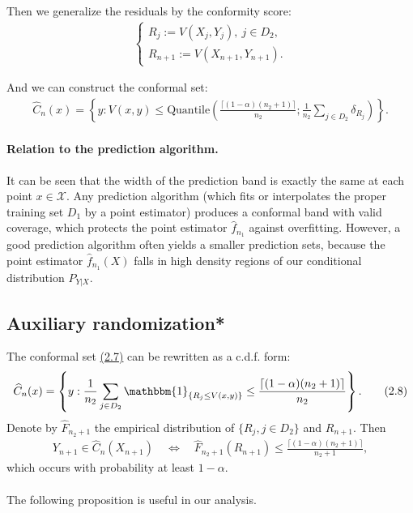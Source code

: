 \documentclass{article}
\numberwithin{equation}{section}
\begin{document}
Then we generalize the residuals by the conformity score:
\begin{align*}
	\begin{cases}
		R_j:=V(X_j,Y_j),\ j\in D_2,\\
		R_{n+1} := V(X_{n+1},Y_{n+1}).
	\end{cases}
	\tag{2.6}
\end{align*}

And we can construct the conformal set:
\begin{align*}
	\widehat{C}_n(x)=\left\{y:V(x,y)\leq\mathrm{Quantile}\left(\frac{\lceil(1-\alpha)(n_2+1)\rceil}{n_2};\frac{1}{n_2}\sum_{j\in D_2}\delta_{R_j}\right)\right\}.\tag{2.7}\label{2.7}
\end{align*}

\paragraph{Relation to the prediction algorithm.} It can be seen that the width of the prediction band is exactly the same at each point $x\in\mathcal{X}.$ Any prediction algorithm (which fits or interpolates the proper training set $D_1$ by a point estimator) produces a conformal band with valid coverage, which protects the point estimator $\widehat{f}_{n_1}$ against overfitting. However, a good prediction algorithm often yields a smaller prediction sets, because the point estimator $\widehat{f}_{n_1}(X)$ falls in high density regions of our conditional distribution $P_{Y|X}$.

\subsection{Auxiliary randomization*} 
The conformal set \hyperref[2.7]{(2.7)} can be rewritten as a c.d.f. form:
\begin{align*}
	\widehat{C}_n(x) = \left\{y:\frac{1}{n_2}\sum_{j\in D_2}\mathbbm{1}_{\{R_j\leq V(x,y)\}}\leq\frac{\lceil(1-\alpha)(n_2+1)\rceil}{n_2}\right\}.\tag{2.8}
\end{align*}
Denote by $\widehat{F}_{n_2+1}$ the empirical distribution of $\{R_j,j\in D_2\}$ and $R_{n+1}.$ Then
\begin{align*}
	Y_{n+1}\in\widehat{C}_{n}(X_{n+1})\quad\Leftrightarrow\quad\widehat{F}_{n_2+1}(R_{n+1})\leq \frac{\lceil(1-\alpha)(n_2+1)\rceil}{n_2+1},\tag{2.9}
\end{align*}
which occurs with probability at least $1-\alpha.$

\paragraph{} The following proposition is useful in our analysis.
\end{document}
